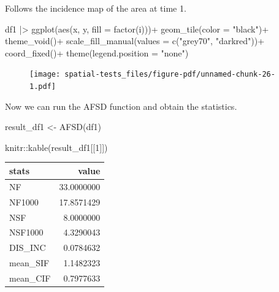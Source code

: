 \documentclass[
  letterpaper,
]{book}
\newenvironment{Shaded}{\begin{snugshade}}{\end{snugshade}}
\newcommand{\AttributeTok}[1]{\textcolor[rgb]{0.40,0.45,0.13}{#1}}
\newcommand{\DecValTok}[1]{\textcolor[rgb]{0.68,0.00,0.00}{#1}}
\newcommand{\FunctionTok}[1]{\textcolor[rgb]{0.28,0.35,0.67}{#1}}
\newcommand{\NormalTok}[1]{\textcolor[rgb]{0.00,0.23,0.31}{#1}}
\newcommand{\OtherTok}[1]{\textcolor[rgb]{0.00,0.23,0.31}{#1}}
\newcommand{\SpecialCharTok}[1]{\textcolor[rgb]{0.37,0.37,0.37}{#1}}
\newcommand{\StringTok}[1]{\textcolor[rgb]{0.13,0.47,0.30}{#1}}
\begin{document}
Follows the incidence map of the area at time 1.

\begin{Shaded}
\begin{Highlighting}[]
\NormalTok{df1 }\SpecialCharTok{|\textgreater{}} 
  \FunctionTok{ggplot}\NormalTok{(}\FunctionTok{aes}\NormalTok{(x, y, }\AttributeTok{fill =} \FunctionTok{factor}\NormalTok{(i)))}\SpecialCharTok{+}
  \FunctionTok{geom\_tile}\NormalTok{(}\AttributeTok{color =} \StringTok{"black"}\NormalTok{)}\SpecialCharTok{+}
  \FunctionTok{theme\_void}\NormalTok{()}\SpecialCharTok{+}
  \FunctionTok{scale\_fill\_manual}\NormalTok{(}\AttributeTok{values =} \FunctionTok{c}\NormalTok{(}\StringTok{"grey70"}\NormalTok{, }\StringTok{"darkred"}\NormalTok{))}\SpecialCharTok{+}
  \FunctionTok{coord\_fixed}\NormalTok{()}\SpecialCharTok{+}
  \FunctionTok{theme}\NormalTok{(}\AttributeTok{legend.position =} \StringTok{"none"}\NormalTok{)}
\end{Highlighting}
\end{Shaded}

\begin{figure}[H]

\texttt{[image: spatial-tests\_files/figure-pdf/unnamed-chunk-26-1.pdf]} \hfill{}

\end{figure}

Now we can run the AFSD function and obtain the statistics.

\begin{Shaded}
\begin{Highlighting}[]
\NormalTok{result\_df1 }\OtherTok{\textless{}{-}} \FunctionTok{AFSD}\NormalTok{(df1)}

\NormalTok{knitr}\SpecialCharTok{::}\FunctionTok{kable}\NormalTok{(result\_df1[[}\DecValTok{1}\NormalTok{]])}
\end{Highlighting}
\end{Shaded}

\begin{longtable}[]{@{}lr@{}}
\toprule\noalign{}
stats & value \\
\midrule\noalign{}
\endhead
\bottomrule\noalign{}
\endlastfoot
NF & 33.0000000 \\
NF1000 & 17.8571429 \\
NSF & 8.0000000 \\
NSF1000 & 4.3290043 \\
DIS\_INC & 0.0784632 \\
mean\_SIF & 1.1482323 \\
mean\_CIF & 0.7977633 \\
\end{longtable}
\end{document}
